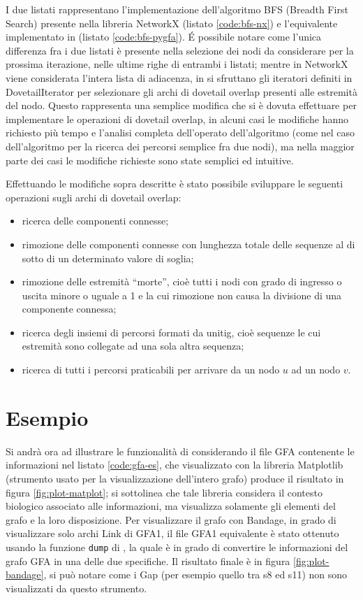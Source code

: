 I due listati rappresentano l'implementazione dell'algoritmo BFS (Breadth First Search) presente
nella libreria NetworkX (listato \ref{code:bfs-nx}) e l'equivalente implementato in \pygfa
(listato \ref{code:bfs-pygfa}). \'E possibile notare come l'unica differenza fra i due listati
è presente nella selezione dei nodi da considerare per la prossima iterazione, nelle ultime
righe di entrambi i listati; mentre in NetworkX viene considerata l'intera lista di adiacenza, in
\pygfa si sfruttano gli iteratori definiti in DovetailIterator per selezionare gli archi di dovetail overlap
presenti alle estremità del nodo.
Questo rappresenta una semplice modifica che si è dovuta effettuare per
implementare le operazioni di dovetail overlap, in alcuni casi le modifiche
hanno richiesto più tempo e l'analisi completa dell'operato dell'algoritmo (come nel
caso dell'algoritmo per la ricerca dei percorsi semplice fra due nodi),
ma nella maggior parte dei casi le modifiche richieste sono state semplici
ed intuitive.

Effettuando le modifiche sopra descritte è stato possibile sviluppare
le seguenti operazioni sugli archi di dovetail overlap:
\begin{itemize}
	\item ricerca delle componenti connesse;
	\item rimozione delle componenti connesse con lunghezza
		totale delle sequenze al di sotto di un determinato valore di soglia;
	\item rimozione delle estremità ``morte'', cioè tutti i nodi con
		grado di ingresso o uscita minore o uguale a 1 e la cui rimozione non causa
		la divisione di una componente connessa;
	\item ricerca degli insiemi di percorsi formati da unitig, cioè sequenze
		le cui estremità sono collegate ad una sola altra sequenza;
	\item ricerca di tutti i percorsi praticabili per arrivare da un nodo $u$ ad
		un nodo $v$.
\end{itemize}

\newpage
\section{Esempio}
Si andrà ora ad illustrare le funzionalità di \pygfa considerando il file GFA
contenente le informazioni nel listato \ref{code:gfa-es}, che visualizzato
con la libreria Matplotlib (strumento usato per la visualizzazione dell'intero grafo)
produce il risultato in figura \ref{fig:plot-matplot}; si sottolinea che tale libreria
considera il contesto biologico associato alle informazioni, ma visualizza
solamente gli elementi del grafo e la loro disposizione.
Per visualizzare il grafo con Bandage, in grado di visualizzare solo archi Link di GFA1,
il file GFA1 equivalente è stato ottenuto usando la funzione \texttt{dump}
di \pygfa, la quale è in grado di convertire le informazioni del grafo GFA
in una delle due specifiche.
Il risultato finale è in figura \ref{fig:plot-bandage}, si
può notare come i Gap (per esempio quello tra s8 ed s11)
non sono visualizzati da questo strumento.

